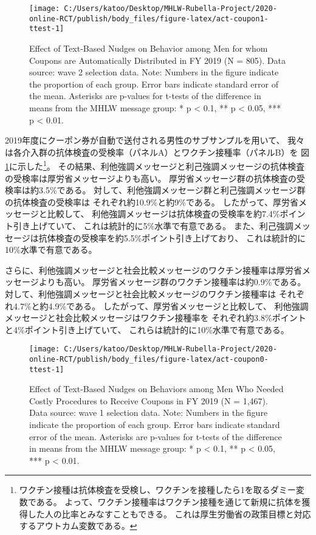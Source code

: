 \documentclass[
  11pt,
  a4paper,
]{article}
\begin{document}
\begin{figure}[t]
\texttt{[image: C:/Users/katoo/Desktop/MHLW-Rubella-Project/2020-online-RCT/publish/body\_files/figure-latex/act-coupon1-ttest-1]} \caption{Effect of Text-Based Nudges on Behavior among Men for whom Coupons are Automatically Distributed in FY 2019 (N = 805). Data source: wave 2 selection data. Note: Numbers in the figure indicate the proportion of each group. Error bars indicate standard error of the mean. Asterisks are p-values for t-tests of the difference in means from the MHLW message group: * p < 0.1, ** p < 0.05, *** p < 0.01.}\label{fig:act-coupon1-ttest}
\end{figure}

2019年度にクーポン券が自動で送付される男性のサブサンプルを用いて、
我々は各介入群の抗体検査の受検率（パネルA）とワクチン接種率（パネルB）を
図\ref{fig:act-coupon1-ttest}に示した\footnote{ワクチン接種は抗体検査を受検し、ワクチンを接種したら1を取るダミー変数である。
  よって、ワクチン接種率はワクチン接種を通じて新規に抗体を獲得した人の比率とみなすこともできる。
  これは厚生労働省の政策目標と対応するアウトカム変数である。}。
その結果、利他強調メッセージと利己強調メッセージの抗体検査の受検率は厚労省メッセージよりも高い。
厚労省メッセージ群の抗体検査の受検率は約3.5\%である。
対して、利他強調メッセージ群と利己強調メッセージ群の抗体検査の受検率は
それぞれ約10.9\%と約9\%である。
したがって、厚労省メッセージと比較して、
利他強調メッセージは抗体検査の受検率を約7.4\%ポイント引き上げていて、
これは統計的に5\%水準で有意である。
また、利己強調メッセージは抗体検査の受検率を約5.5\%ポイント引き上げており、
これは統計的に10\%水準で有意である。

さらに、利他強調メッセージと社会比較メッセージのワクチン接種率は厚労省メッセージよりも高い。
厚労省メッセージ群のワクチン接種率は約0.9\%である。
対して、利他強調メッセージと社会比較メッセージのワクチン接種率は
それぞれ4.7\%と約4.9\%である。
したがって、厚労省メッセージと比較して、
利他強調メッセージと社会比較メッセージはワクチン接種率を
それぞれ約3.8\%ポイントと4\%ポイント引き上げていて、
これらは統計的に10\%水準で有意である。

\begin{figure}[t]
\texttt{[image: C:/Users/katoo/Desktop/MHLW-Rubella-Project/2020-online-RCT/publish/body\_files/figure-latex/act-coupon0-ttest-1]} \caption{Effect of Text-Based Nudges on Behaviors among Men Who Needed Costly Procedures to Receive Coupons in FY 2019 (N = 1,467). Data source: wave 1 selection data. Note: Numbers in the figure indicate the proportion of each group. Error bars indicate standard error of the mean. Asterisks are p-values for t-tests of the difference in means from the MHLW message group: * p < 0.1, ** p < 0.05, *** p < 0.01.}\label{fig:act-coupon0-ttest}
\end{figure}
\end{document}
